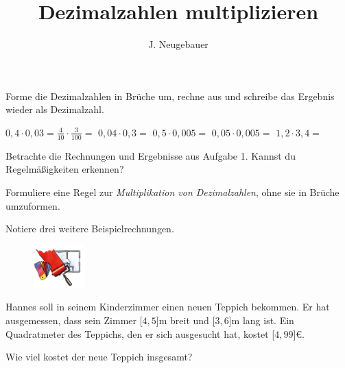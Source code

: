 \documentclass[11pt, a4paper]{scrartcl}
\author{J. Neugebauer}
\title{Dezimalzahlen multiplizieren}
\date{\Heute}
\begin{document}
	\ReiheTitel
	
	\begin{aufgabe}
		Forme die Dezimalzahlen in Brüche um, rechne aus und schreibe das Ergebnis wieder als Dezimalzahl.
		
		\begin{teilaufgaben}
			\teilaufgabe $0,4\cdot 0,03 = \frac{4}{10}\cdot \frac{3}{100} = $\linie
			\teilaufgabe $0,04\cdot 0,3 = $\linie
			\teilaufgabe $0,5\cdot 0,005 = $\linie
			\teilaufgabe $0,05\cdot 0,005 = $\linie
			\teilaufgabe $1,2\cdot 3,4 = $\linie
		\end{teilaufgaben}
	\end{aufgabe}

	\begin{aufgabe}
		Betrachte die Rechnungen und Ergebnisse aus Aufgabe 1. Kannst du Regelmäßigkeiten erkennen?
		
		Formuliere eine Regel zur \emph{Multiplikation von Dezimalzahlen}, ohne sie in Brüche umzuformen.
		
		\feldLin[1cm]{4}
	\end{aufgabe}

	\begin{aufgabe}
		Notiere drei weitere Beispielrechnungen.
		
		\feldLin[1cm]{3}
	\end{aufgabe}
	
	\begin{aufgabe}
		\begin{figure}
			\includegraphics[width=2cm]{6_15-Abb_Renovieren.jpg}
		\end{figure}
		Hannes soll in seinem Kinderzimmer einen neuen Teppich bekommen. Er hat ausgemessen, dass sein Zimmer \unit[$4,5$]{m} breit und \unit[$3,6$]{m} lang ist. Ein Quadratmeter des Teppichs, den er sich ausgesucht hat, kostet \unit[$4,99$]{\euro}.\bigskip
		
		Wie viel kostet der neue Teppich insgesamt?
	\end{aufgabe}
\end{document}
